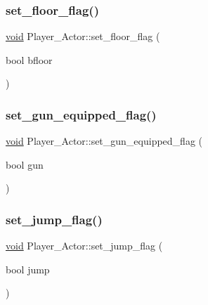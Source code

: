 \mbox{\label{classPlayer__Actor_acc7db4ce6aea45fca15f9c0ac829656c}} 
\subsubsection{\texorpdfstring{set\+\_\+floor\+\_\+flag()}{set\_floor\_flag()}}
{\footnotesize\ttfamily \hyperlink{imgui__impl__opengl3__loader_8h_ac668e7cffd9e2e9cfee428b9b2f34fa7}{void} Player\+\_\+\+Actor\+::set\+\_\+floor\+\_\+flag (\begin{DoxyParamCaption}\item[{bool}]{bfloor }\end{DoxyParamCaption})\hspace{0.3cm}{\ttfamily [inline]}}

\mbox{\label{classPlayer__Actor_a026209b92ddb9579ed0cf9c648a3b6c1}} 
\subsubsection{\texorpdfstring{set\+\_\+gun\+\_\+equipped\+\_\+flag()}{set\_gun\_equipped\_flag()}}
{\footnotesize\ttfamily \hyperlink{imgui__impl__opengl3__loader_8h_ac668e7cffd9e2e9cfee428b9b2f34fa7}{void} Player\+\_\+\+Actor\+::set\+\_\+gun\+\_\+equipped\+\_\+flag (\begin{DoxyParamCaption}\item[{bool}]{gun }\end{DoxyParamCaption})\hspace{0.3cm}{\ttfamily [inline]}}

\mbox{\label{classPlayer__Actor_a52135592f396bf6382b240f6365ce440}} 
\subsubsection{\texorpdfstring{set\+\_\+jump\+\_\+flag()}{set\_jump\_flag()}}
{\footnotesize\ttfamily \hyperlink{imgui__impl__opengl3__loader_8h_ac668e7cffd9e2e9cfee428b9b2f34fa7}{void} Player\+\_\+\+Actor\+::set\+\_\+jump\+\_\+flag (\begin{DoxyParamCaption}\item[{bool}]{jump }\end{DoxyParamCaption})\hspace{0.3cm}{\ttfamily [inline]}}

